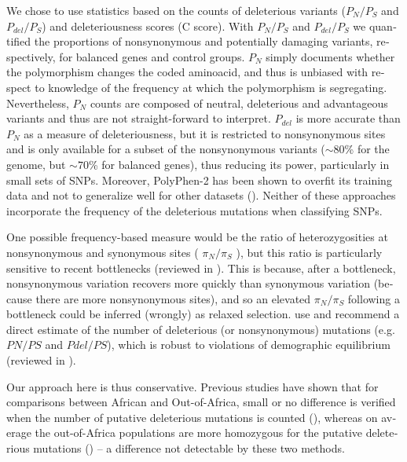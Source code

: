 \begin{refsection}
\begin{otherlanguage}{english}
We chose to use statistics based on the counts of deleterious variants ($P_{N}/P_{S}$ and $P_{del}/P_{S}$) and deleteriousness scores (C score). With $P_{N}/P_{S}$ and $P_{del}/P_{S}$ we quantified the proportions of nonsynonymous and potentially damaging variants, respectively, for balanced genes and control groups. $P_{N}$ simply documents whether the  polymorphism changes the coded aminoacid, and thus is unbiased with respect to knowledge of the frequency at which the polymorphism is segregating. Nevertheless, $P_{N}$ counts are composed of neutral, deleterious and advantageous variants and thus are not  straight-forward to interpret. $P_{del}$ is more accurate than $P_{N}$ as a measure of deleteriousness, but it is restricted to  nonsynonymous sites and is only available for a subset of the nonsynonymous variants ($\sim 80$\% for the genome, but $\sim 70$\% for balanced genes), thus reducing its power, particularly in small sets of SNPs. Moreover, PolyPhen-2 has been shown to overfit its training data and not to generalize well for other datasets (\cite{Grimm2015}). Neither of these approaches incorporate the frequency of the deleterious mutations when classifying SNPs.  

One possible frequency-based measure would be the ratio of heterozygosities at nonsynonymous and synonymous sites ( $\pi_{N}/\pi_{S}$ ), but this ratio is particularly sensitive to recent bottlenecks (reviewed in \cite{Brandvain2016}). This is because, after a bottleneck, nonsynonymous variation recovers more quickly than synonymous variation (because there are more nonsynonymous sites), and so an elevated $\pi_{N}/\pi_{S}$  following a bottleneck could be inferred (wrongly) as relaxed  selection. \textcite{Do2015,Simons2014} use and recommend a direct estimate of the number of deleterious (or nonsynonymous) mutations (e.g. $PN/PS$ and $Pdel/PS$), which is robust to violations of demographic equilibrium (reviewed in \cite{Brandvain2016,Henn2015a}). 

Our approach here is thus conservative. Previous studies have shown that for comparisons between African and Out-of-Africa, small or no difference is verified when the number of putative deleterious mutations is counted (\cite{Henn2016,Tennessen2012,Do2015,Lohmueller2014}), whereas on average the out-of-Africa populations are more homozygous for the putative deleterious mutations (\cite{Lohmueller2008}) -- a difference not detectable by these two methods.


\end{otherlanguage}
\end{refsection}
